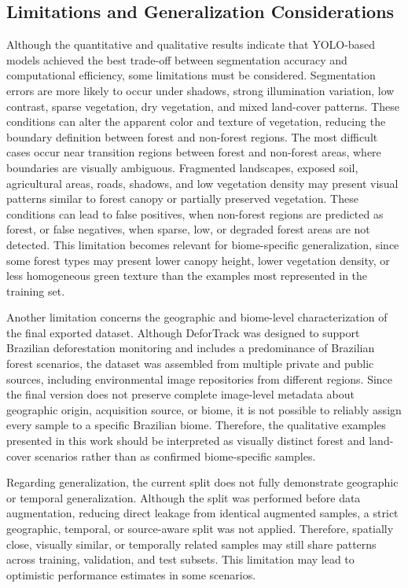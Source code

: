 \documentclass[journal,article,submit,pdftex,moreauthors]{Definitions/mdpi}
\begin{document}
\subsection{Limitations and Generalization Considerations}
\label{sec:limitations}

Although the quantitative and qualitative results indicate that YOLO-based models achieved the best trade-off between segmentation accuracy and computational efficiency, some limitations must be considered. Segmentation errors are more likely to occur under shadows, strong illumination variation, low contrast, sparse vegetation, dry vegetation, and mixed land-cover patterns. These conditions can alter the apparent color and texture of vegetation, reducing the boundary definition between forest and non-forest regions. The most difficult cases occur near transition regions between forest and non-forest areas, where boundaries are visually ambiguous. Fragmented landscapes, exposed soil, agricultural areas, roads, shadows, and low vegetation density may present visual patterns similar to forest canopy or partially preserved vegetation. These conditions can lead to false positives, when non-forest regions are predicted as forest, or false negatives, when sparse, low, or degraded forest areas are not detected. This limitation becomes relevant for biome-specific generalization, since some forest types may present lower canopy height, lower vegetation density, or less homogeneous green texture than the examples most represented in the training set.

Another limitation concerns the geographic and biome-level characterization of the final exported dataset. Although DeforTrack was designed to support Brazilian deforestation monitoring and includes a predominance of Brazilian forest scenarios, the dataset was assembled from multiple private and public sources, including environmental image repositories from different regions. Since the final version does not preserve complete image-level metadata about geographic origin, acquisition source, or biome, it is not possible to reliably assign every sample to a specific Brazilian biome. Therefore, the qualitative examples presented in this work should be interpreted as visually distinct forest and land-cover scenarios rather than as confirmed biome-specific samples.

Regarding generalization, the current split does not fully demonstrate geographic or temporal generalization. Although the split was performed before data augmentation, reducing direct leakage from identical augmented samples, a strict geographic, temporal, or source-aware split was not applied. Therefore, spatially close, visually similar, or temporally related samples may still share patterns across training, validation, and test subsets. This limitation may lead to optimistic performance estimates in some scenarios. 
\end{document}
